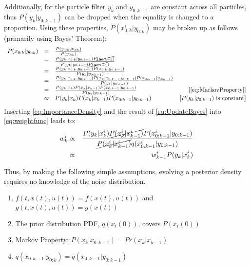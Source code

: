 Additionally, for the particle filter $y_k$ and $y_{0:k-1}$ are 
constant across all particles, thus $P(y_k| y_{0:k-1})$ can
be dropped when the equality is changed to a proportion. 
Using these properties, $P(x^i_{0:k} | y_{0:k})$ may be broken up as follows 
(primarily using Bayes' Theorem):
\begin{equation}
\begin{array}{lclr}
P(x_{0:k} | y_{0:k}) & = & \frac{P(y_{0:k}, x_{0:k})}{P(y_{0:k})} & \\
 & = & \frac{P(y_k, x_{0:k} | y_{0:k-1}) \cancel{P(y_{0:k-1})}}{P(y_k | y_{0:k-1}) \cancel{P(y_{0:k-1})}} & \\
 & = & \frac{P(y_k| x_{0:k}, y_{0:k-1}) P(x_{0:k} | y_{0:k-1})}{P(y_k | y_{0:k-1}) } & \\
 & = & \frac{P(y_k| x_{0:k}, y_{0:k-1}) P(x_k | x_{0:k-1}, y_{0:k-1}) P(x_{0:k-1} | y_{0:k-1})}{P(y_k | y_{0:k-1})} &  \\
& = & \frac{P(y_k| x_k) P(x_k | x_{k-1}) P(x_{0:k-1} | y_{0:k-1})}{P(y_k | y_{0:k-1})}  & [\text{\autoref{eq:MarkovProperty}}]\\
& \propto & P(y_k| x_k) P(x_k | x_{k-1}) P(x_{0:k-1} | y_{0:k-1}) & [P(y_k|y_{0:k-1}) \text{ is constant}]
 \end{array}
 \label{eq:UpdateBayes}
\end{equation}
Inserting \autoref{eq:ImportanceDensity} and the result of \autoref{eq:UpdateBayes}
into \autoref{eq:weightfunc} leads to:
\begin{eqnarray}
w^i_k & \propto & \frac{P(y_k| x^i_k) \cancel{P(x^i_k | x^i_{k-1})} P(x^i_{0:k-1} | y_{0:k-1})}
                         {\cancel{P(x^i_k | x^i_{k-1})}q(x^i_{0:k-1} | y_{0:k-1})} \nonumber \\
& \propto & w^i_{k-1}P(y_k| x^i_k) 
\label{eq:weightevolve}
\end{eqnarray}

Thus, by making the following simple assumptions, evolving a posterior
density  requires no knowledge of the noise distribution.
\begin{enumerate}
\item $f(t, x(t), u(t)) = f(x(t), u(t))$ and $g(t, x(t), u(t)) = g(x(t))$ 
\item The prior distribution PDF, $q(x_i(0))$, covers $P(x_i(0))$
\item Markov Property: $P(x_k | x_{0:k-1}) = Pr(x_k | x_{k-1})$
\item $q(x_{0:k-1} | y_{0:k}) = q(x_{0:k-1} | y_{0:k-1})$
\end{enumerate}

